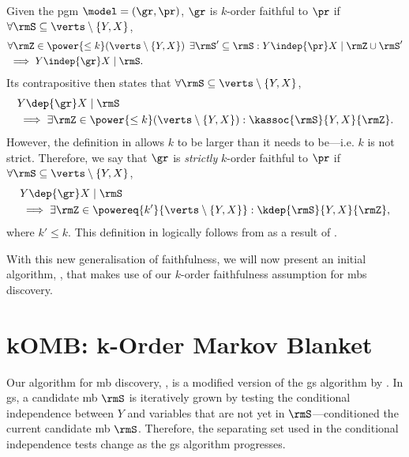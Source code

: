 \documentclass[accepted]{uai2026} %
\theoremstyle{plain}
\theoremstyle{definition}
\theoremstyle{remark}
\begin{document}
\begin{assumption}\label{def:k-faith}
  Given the \gls{pgm} $\model=(\gr, \pr)$, $\gr$ is $k$-order faithful
  to $\pr$ if
  $\forall \rmS \subseteq \verts\setminus\{Y,X\}$,
  \begin{gather}
    \label{eq:k-faith-indep}
    \begin{aligned}
      &\forall \rmZ \in \power{\leq k}(\verts\setminus\{Y,X\})\:\:
        \exists \rmS' \subseteq \rmS :
      Y \indep{\pr} X \mid \rmZ \cup \rmS'\\
      &\implies
      Y \indep{\gr} X \mid \rmS.
    \end{aligned}
  \end{gather}
  Its contrapositive then states
  that $\forall \rmS \subseteq \verts\setminus\{Y,X\}$,
  \begin{gather}
    \label{eq:k-faith-1}
    \begin{aligned}
      &Y \dep{\gr} X \mid \rmS\\
      &\implies
      \exists \rmZ \in \power{\leq k}(\verts\setminus\{Y,X\}) :
        \kassoc{\rmS}{Y,X}{\rmZ}.
    \end{aligned}
  \end{gather}
  However, the definition in  allows $k$ to be larger
  than it needs to be---i.e. $k$ is not strict. Therefore, we say that
  $\gr$ is \emph{strictly} $k$-order faithful to $\pr$ if
  $\forall \rmS \subseteq \verts\setminus\{Y,X\}$,
  \begin{gather}
    \label{eq:k-faith-2}
    \begin{aligned}
      &Y \dep{\gr} X \mid \rmS\\
      &\implies
      \exists \rmZ \in \powereq{k'}{\verts\setminus\{Y,X\}} :
      \kdep{\rmS}{Y,X}{\rmZ},
    \end{aligned}
  \end{gather}
  where $k'\leq k$. This definition in  logically
  follows from  as a result of
  .
\end{assumption}

With this new generalisation of faithfulness, we will now
present an initial algorithm, {\method}, that makes use of our
$k$-order faithfulness assumption for \glspl{mb} discovery.

\section{kOMB: k-Order Markov Blanket}\label{sec:algo}
Our algorithm for \acrfull{mb} discovery, {\method}, is
a modified version of the \acrfull{gs} algorithm by
\citet{margaritis1999}. In \gls{gs}, a candidate \gls{mb} $\rmS$ is
iteratively grown by testing the conditional independence between $Y$
and variables that are not yet in $\rmS$---conditioned the current
candidate \gls{mb} $\rmS$. Therefore, the separating set used in the
conditional independence tests change as the \gls{gs} algorithm
progresses.
\end{document}
